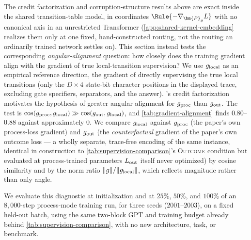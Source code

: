 The credit factorization and corruption-structure results above are exact
inside the shared transition-table model, in coordinates
$\Rule{-\nabla_{\bm{P}_g}L}$ with no canonical axis in an unrestricted
Transformer (\cref{app:shared-kernel-embedding} realizes them only at one
fixed, hand-constructed routing, not the routing an ordinarily trained
network settles on). This section instead tests the corresponding
\emph{angular-alignment} question: how closely does the training gradient
align with the gradient of true local-transition supervision? We use
$g_{\rm local}$ as an empirical reference direction, the gradient of directly
supervising the true local transitions (only the $D\times4$ state-bit
character positions in the displayed trace, excluding gate specifiers,
separators, and the answer). 's credit
factorization motivates the hypothesis of greater angular alignment for
$g_{\rm proc}$ than $g_{\rm out}$. The test is $\cos(g_{\rm proc},g_{\rm local})\gg
\cos(g_{\rm out},g_{\rm local})$, and \cref{tab:gradient-alignment} finds
$0.80$--$0.88$ against approximately $0$. We compare $g_{\rm local}$
against $g_{\rm proc}$ (the
paper's own process-loss gradient) and $g_{\rm out}$ (the
\emph{counterfactual} gradient of the paper's own outcome loss --- a
wholly separate, trace-free encoding of the same instance, identical in
construction to \cref{tab:supervision-comparison}'s \textsc{Outcome}
condition but evaluated at process-trained parameters $L_{\rm out}$ itself
never optimized) by cosine similarity and by the norm ratio
$\|g\|/\|g_{\rm local}\|$, which reflects magnitude rather than only
angle.

We evaluate this diagnostic at initialization and at $25\%$, $50\%$, and
$100\%$ of an $8{,}000$-step process-mode training run, for three seeds
($2001$--$2003$), on a fixed held-out batch, using the same two-block GPT
and training budget already behind \cref{tab:supervision-comparison},
with no new architecture, task, or benchmark.

